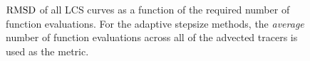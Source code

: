 \begin{figure}[htpb]
    \centering
    
    \caption[$\rmsd$ of all LCS curves as a function of the required number
    of function evaluations]
                {$\rmsd$ of all LCS curves as a function of the required number
                of function evaluations. For the adaptive stepsize methods,
                the \emph{average} number of function evaluations across all of
                the advected tracers is used as the metric.}
    \label{fig:lcs_err_both}
\end{figure}
